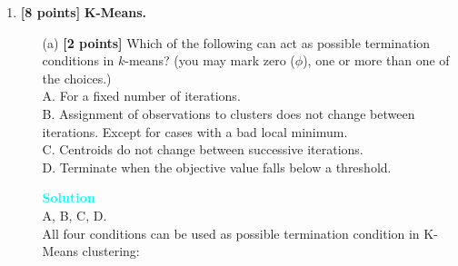 \documentclass[10pt]{article}
\newenvironment{solution}
    { \begin{mdframed}[backgroundcolor=gray!10] \textcolor{cyan}{\textbf{Solution}} \\}
    {  \end{mdframed}}
\begin{document}
\begin{enumerate}
\begin{itemize}
\begin{solution}
			            ultimate goal.
		            \end{solution}
		      \item[(f)] The $k$-means algorithm is guaranteed to converge to the global optimum.
		            \begin{solution}
			            False: $k$-means can produce a sub-optimal answer,
			            and it sensitive to the initial position of the centers;
			            it does compute what’s called a ``local optimum''.
		            \end{solution}
		      \item[(g)] The bag-of-words model encodes text as a vector.
		            \begin{solution}
			            True.
		            \end{solution}
		      \item[(h)] A common form of feature engineering on continuous data is one-hot-encoding.
		            \begin{solution}
			            False: One-hot encoding is used for capturing the presence of boolean features.
		            \end{solution}
	      \end{itemize}

	\item \textbf{[8 points]} \textbf{K-Means.}
	      \begin{itemize}

		      \item[(a)] \textbf{[2 points]}
		            Which of the following can act as possible termination conditions in $k$-means?
		            (you may mark zero ($\phi$), one or more than one of the choices.)\\
		            A. For a fixed number of iterations.\\
		            B. Assignment of observations to clusters does not change between iterations. Except for cases with a bad local minimum.\\
		            C. Centroids do not change between successive iterations.\\
		            D. Terminate when the objective value falls below a threshold.
		            \begin{solution}
			            A, B, C, D.\\
			            All four conditions can be used as possible termination condition in K-Means clustering:


\end{solution}
\end{itemize}
\end{enumerate}
\end{document}
